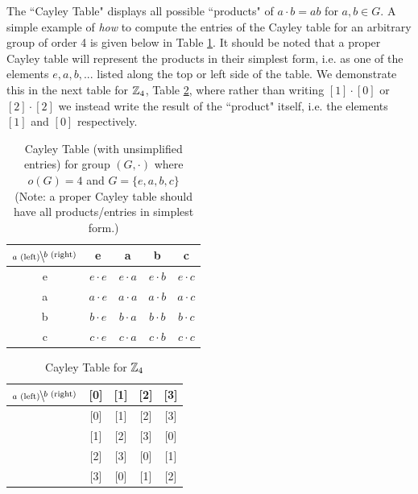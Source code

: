 \noindent The ``Cayley Table" displays all possible ``products" of $a\cdot b=ab$ for $a,b\in G$. A
simple example of \textit{how} to compute the entries of the Cayley table for an arbitrary group of
order 4 is given below in Table \ref{tab:Cayley_dummy}. It should be noted that a proper Cayley
table will represent the products in their simplest form, i.e. as one of the elements $e,a,b,...$
listed along the top or left side of the table. We demonstrate this in the next table for ${\mathbb{Z}}_4$,
Table \ref{tab:Cayley_Z4}, where rather than writing $[1]\cdot [0]$ or $[2]\cdot [2]$ we instead
write the result of the ``product" itself, i.e. the elements $[1]$ and $[0]$ respectively.
\begin{table}[h!]
    \centering
    \begin{tabular}{c||c|c|c|c|}
         $\bsfrac{b\text{ (right)}}{a\text{ (left)}}$& e&a&b&c  \\ \hline \hline
         e&$e\cdot e$&$e\cdot a$&$e\cdot b$&$e\cdot c$  \\ \hline
         a&$a\cdot e$&$a\cdot a$&$a\cdot b$&$a\cdot c$  \\ \hline
         b&$b\cdot e$&$b\cdot a$&$b\cdot b$&$b\cdot c$  \\ \hline
         c&$c\cdot e$&$c\cdot a$&$c\cdot b$&$c\cdot c$ \\ \hline
    \end{tabular}
    \caption{Cayley Table (with unsimplified entries) for group $(G,\cdot)$ where $o(G)=4$ and $G=\{e,a,b,c\}$ \\ (Note: a proper Cayley table should have all products/entries in simplest form.)}
    \label{tab:Cayley_dummy}
\end{table}
\begin{table}[h!]
    \centering
    \begin{tabular}{c||c|c|c|c|}
         $\bsfrac{b\text{ (right)}}{a\text{ (left)}}$& [0]&[1]&[2]&[3]  \\ \hline \hline
         [0]&[0]&[1]&[2]&[3]  \\ \hline
         [1]&[1]&[2]&[3]&[0]  \\ \hline
         [2]&[2]&[3]&[0]&[1]  \\ \hline
         [3]&[3]&[0]&[1]&[2] \\ \hline
    \end{tabular}
    \caption{Cayley Table for ${\mathbb{Z}}_4$}
    \label{tab:Cayley_Z4}
\end{table}

